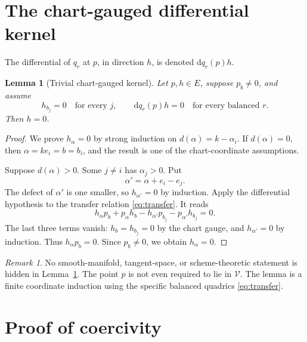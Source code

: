 \documentclass[11pt]{article}
\newtheorem{lemma}[theorem]{Lemma}
\theoremstyle{definition}
\theoremstyle{remark}
\newtheorem{remark}[theorem]{Remark}
\newcommand{\V}{\mathcal V}
\newcommand{\dd}{\mathrm d}
\begin{document}
\section{The chart-gauged differential kernel}

The differential of \(q_r\) at \(p\), in direction \(h\), is denoted
\(\dd q_r(p)h\).

\begin{lemma}[Trivial chart-gauged kernel]\label{lem:kernel}
Let \(p,h\in E\), suppose \(p_b\neq0\), and assume
\[
  h_{b_j}=0\quad\text{for every }j,
  \qquad
  \dd q_r(p)h=0\quad\text{for every balanced }r.
\]
Then \(h=0\).
\end{lemma}

\begin{proof}
We prove \(h_\alpha=0\) by strong induction on
\(d(\alpha)=k-\alpha_i\).  If \(d(\alpha)=0\), then
\(\alpha=ke_i=b=b_i\), and the result is one of the chart-coordinate
assumptions.

Suppose \(d(\alpha)>0\).  Some \(j\neq i\) has \(\alpha_j>0\).  Put
\[
  \alpha'=\alpha+e_i-e_j.
\]
The defect of \(\alpha'\) is one smaller, so \(h_{\alpha'}=0\) by
induction.  Apply the differential hypothesis to the transfer relation
\eqref{eq:transfer}.  It reads
\[
  h_\alpha p_b+p_\alpha h_b
   -h_{\alpha'}p_{b_j}-p_{\alpha'}h_{b_j}=0.
\]
The last three terms vanish: \(h_b=h_{b_j}=0\) by the chart gauge, and
\(h_{\alpha'}=0\) by induction.  Thus \(h_\alpha p_b=0\).  Since
\(p_b\neq0\), we obtain \(h_\alpha=0\).
\end{proof}

\begin{remark}
No smooth-manifold, tangent-space, or scheme-theoretic statement is
hidden in Lemma~\ref{lem:kernel}.  The point \(p\) is not even required
to lie in \(\V\).  The lemma is a finite coordinate induction using the
specific balanced quadrics \eqref{eq:transfer}.
\end{remark}

\section{Proof of coercivity}
\end{document}
